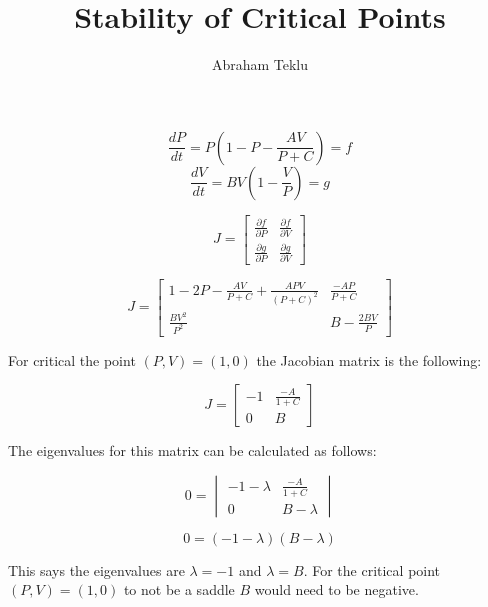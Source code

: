 \documentclass[12]{article}
\begin{document}
\title{Stability of Critical Points}
\author{Abraham Teklu}
\date{}
\maketitle

$$\frac{dP}{dt} = P\left(1-P-\frac{AV}{P+C}\right) = f$$ 
$$\frac{dV}{dt} = BV(1-\frac{V}{P}) = g$$

\begin{Large}
$$J = \begin{bmatrix}
\frac{\partial f}{\partial P} & \frac{\partial f}{\partial V}\\
\frac{\partial g}{\partial P} & \frac{\partial g}{\partial V}
\end{bmatrix}
$$
\end{Large}

\begin{Large}
$$J = \begin{bmatrix}
1-2P-\frac{AV}{P+C} + \frac{APV}{(P+C)^2} & \frac{-AP}{P+C}\\
\frac{BV^2}{P^2} & B - \frac{2BV}{P}
\end{bmatrix}
$$
\end{Large}
For critical the point $(P,V) = (1,0)$ the Jacobian matrix is the following:
\begin{Large}
$$J = \begin{bmatrix}
-1 & \frac{-A}{1+C}\\
0 & B
\end{bmatrix}
$$
\end{Large}
The eigenvalues for this matrix can be calculated as follows:
\begin{Large}
$$0 = \begin{vmatrix}
-1-\lambda & \frac{-A}{1+C}\\
0 & B-\lambda
\end{vmatrix}
$$

$$0 = (-1-\lambda)(B-\lambda)$$
\end{Large}
This says the eigenvalues are $\lambda = -1$ and $\lambda = B$. For the critical point $(P,V) = (1,0)$ to not be a saddle $B$ would need to be negative.
\end{document}

